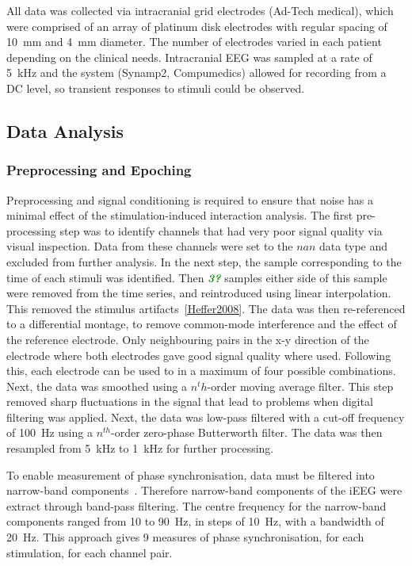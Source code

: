 \documentclass[]{article}
\newcommand{\dean}[1]{\textsf{\emph{\textbf{\textcolor{green}{#1}}}}}
\begin{document}
All data was collected via intracranial grid electrodes (Ad-Tech medical), which were comprised of an array of platinum disk electrodes with regular spacing of 10~mm and 4~mm diameter. The number of electrodes varied in each patient depending on the clinical needs. Intracranial EEG was sampled at a rate of 5~kHz and the system (Synamp2, Compumedics) allowed for recording from a DC level, so transient responses to stimuli could be observed.

\subsection{Data Analysis}
\subsubsection{Preprocessing and Epoching}
Preprocessing and signal conditioning is required to ensure that noise has a minimal effect of the stimulation-induced interaction analysis. The first pre-processing step was to identify channels that had very poor signal quality via visual inspection. Data from these channels were set to the $nan$ data type and excluded from further analysis. In the next step, the sample corresponding to the time of each stimuli was identified. Then \dean{3?} samples either side of this sample were removed from the time series, and reintroduced using linear interpolation. This removed the stimulus artifacts~\ref{Heffer2008}. The data was then re-referenced to a differential montage, to remove common-mode interference and the effect of the reference electrode. Only neighbouring pairs in the x-y direction of the electrode where both electrodes gave good signal quality where used. Following this, each electrode can be used to in a maximum of four possible combinations. Next, the data was smoothed using a $n^th$-order moving average filter. This step removed sharp fluctuations in the signal that lead to problems when digital filtering was applied. Next, the data was low-pass filtered with a cut-off frequency of 100~Hz using a $n^{th}$-order zero-phase Butterworth filter. The data was then resampled from 5~kHz to 1~kHz for further processing.

To enable measurement of phase synchronisation, data must be filtered into narrow-band components~\cite{Rosenblum2004}. Therefore narrow-band components of the iEEG were extract through band-pass filtering. The centre frequency for the narrow-band components ranged from 10 to 90~Hz, in steps of 10~Hz, with a bandwidth of 20~Hz. This approach gives 9 measures of phase synchronisation, for each stimulation, for each channel pair.
\end{document}
